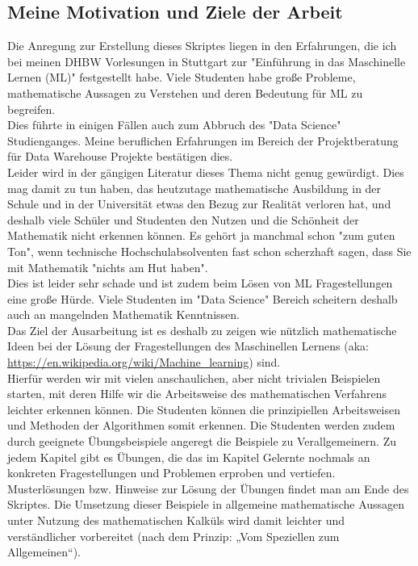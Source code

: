 \documentclass[12pt]{article}
\begin{document}
\subsection{Meine Motivation und Ziele der Arbeit}
Die Anregung zur Erstellung dieses Skriptes liegen in den Erfahrungen, die ich bei meinen DHBW Vorlesungen in Stuttgart zur "Einführung in das Maschinelle Lernen (ML)" festgestellt habe. Viele Studenten habe große Probleme, mathematische Aussagen zu Verstehen und deren Bedeutung für ML zu begreifen.
\\
Dies führte in einigen Fällen auch zum Abbruch des "Data Science" Studienganges. Meine beruflichen Erfahrungen im Bereich der Projektberatung für Data Warehouse Projekte bestätigen dies.\\
Leider wird in der gängigen Literatur dieses Thema nicht genug gewürdigt. Dies mag damit zu tun haben, das heutzutage mathematische Ausbildung in der Schule und in der Universität etwas den Bezug zur Realität verloren hat, und deshalb viele Schüler und Studenten den Nutzen und die Schönheit der Mathematik nicht erkennen können. Es gehört ja manchmal schon "zum guten Ton", wenn technische Hochschulabsolventen fast schon scherzhaft sagen, dass Sie mit Mathematik "nichts am Hut haben".\\
Dies ist leider sehr schade und ist zudem beim Lösen von ML Fragestellungen eine große Hürde. Viele Studenten im "Data Science" Bereich scheitern deshalb auch an mangelnden Mathematik Kenntnissen.\\[0.2cm]
%
Das Ziel der Ausarbeitung ist es deshalb zu zeigen wie nützlich mathematische Ideen bei der Lösung der Fragestellungen des Maschinellen Lernens (aka: \url{https://en.wikipedia.org/wiki/Machine_learning}) sind.\\
Hierfür werden wir mit vielen anschaulichen, aber nicht trivialen Beispielen starten, mit deren Hilfe wir die Arbeitsweise des mathematischen Verfahrens leichter erkennen können. Die Studenten können die prinzipiellen Arbeitsweisen und Methoden der Algorithmen somit erkennen. Die Studenten werden zudem durch geeignete Übungsbeispiele angeregt die Beispiele zu Verallgemeinern. Zu jedem Kapitel gibt es Übungen, die das im Kapitel Gelernte nochmals an konkreten Fragestellungen und Problemen erproben und vertiefen. \\
Musterlösungen bzw. Hinweise zur Lösung der Übungen findet man am Ende des Skriptes. Die Umsetzung dieser Beispiele in allgemeine mathematische Aussagen unter Nutzung des mathematischen Kalküls wird damit leichter und verständlicher vorbereitet (nach dem Prinzip: „Vom Speziellen zum Allgemeinen“). \\[0.1cm]
\end{document}
